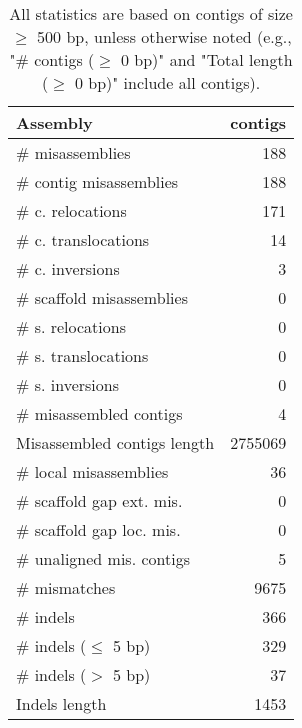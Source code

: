\documentclass[12pt,a4paper]{article}
\begin{document}
\begin{table}[ht]
\begin{center}
\caption{All statistics are based on contigs of size $\geq$ 500 bp, unless otherwise noted (e.g., "\# contigs ($\geq$ 0 bp)" and "Total length ($\geq$ 0 bp)" include all contigs).}
\begin{tabular}{|l*{1}{|r}|}
\hline
Assembly & contigs \\ \hline
\# misassemblies & 188 \\ \hline
\hspace{2mm}\# contig misassemblies & 188 \\ \hline
\hspace{5mm}\# c. relocations & 171 \\ \hline
\hspace{5mm}\# c. translocations & 14 \\ \hline
\hspace{5mm}\# c. inversions & 3 \\ \hline
\hspace{2mm}\# scaffold misassemblies & 0 \\ \hline
\hspace{5mm}\# s. relocations & 0 \\ \hline
\hspace{5mm}\# s. translocations & 0 \\ \hline
\hspace{5mm}\# s. inversions & 0 \\ \hline
\# misassembled contigs & 4 \\ \hline
Misassembled contigs length & 2755069 \\ \hline
\# local misassemblies & 36 \\ \hline
\# scaffold gap ext. mis. & 0 \\ \hline
\# scaffold gap loc. mis. & 0 \\ \hline
\# unaligned mis. contigs & 5 \\ \hline
\# mismatches & 9675 \\ \hline
\# indels & 366 \\ \hline
\hspace{5mm}\# indels ($\leq$ 5 bp) & 329 \\ \hline
\hspace{5mm}\# indels ($>$ 5 bp) & 37 \\ \hline
Indels length & 1453 \\ \hline
\end{tabular}
\end{center}
\end{table}
\end{document}
